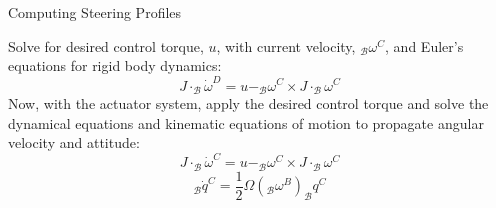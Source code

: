 \documentclass{beamer}
\begin{document}
\begin{frame}{Computing Steering Profiles}

\begin{block}{ }
	Solve for desired control torque, $u$, with current velocity, $_\mathcal{B}\omega^C$, and Euler's equations for rigid body dynamics: 
	\begin{equation}
	J \cdot _\mathcal{B}\dot{\omega}^D = u - _\mathcal{B}\omega^C \times J \cdot _\mathcal{B}\omega^C 
	\end{equation}
	Now, with the actuator system, apply the desired control torque and solve the dynamical equations and kinematic equations of motion to propagate angular velocity and attitude: 
	\begin{equation}
	J \cdot _\mathcal{B}\dot{\omega}^C = u - _\mathcal{B}\omega^C \times J \cdot _\mathcal{B}\omega^C 
	\end{equation}
	\begin{equation}
	_\mathcal{B}\dot{q}^C = \frac{1}{2} \Omega (_\mathcal{B}\omega^B) _\mathcal{B}q^{C}
	\end{equation}
\end{block}

\end{frame}
\end{document}
